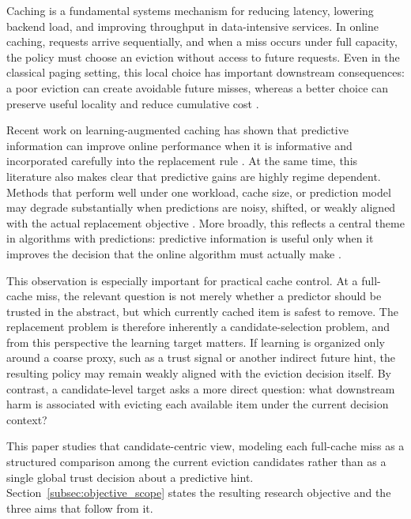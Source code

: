 \documentclass[preprint,12pt]{elsarticle}
\begin{document}
Caching is a fundamental systems mechanism for reducing latency, lowering backend load, and improving throughput in data-intensive services. In online caching, requests arrive sequentially, and when a miss occurs under full capacity, the policy must choose an eviction without access to future requests. Even in the classical paging setting, this local choice has important downstream consequences: a poor eviction can create avoidable future misses, whereas a better choice can preserve useful locality and reduce cumulative cost \cite{belady1966replacement_algorithms,fiat1991competitive_paging}.

Recent work on learning-augmented caching has shown that predictive information can improve online performance when it is informative and incorporated carefully into the replacement rule \cite{lykouris2021competitive_caching,antoniadis2020online_metric_untrusted,im2022parsimonious_lac}. At the same time, this literature also makes clear that predictive gains are highly regime dependent. Methods that perform well under one workload, cache size, or prediction model may degrade substantially when predictions are noisy, shifted, or weakly aligned with the actual replacement objective \cite{wei2020better_simpler_lac,chledowski2021robust_lac_experimental}. More broadly, this reflects a central theme in algorithms with predictions: predictive information is useful only when it improves the decision that the online algorithm must actually make \cite{mitzenmacher2022algorithms_predictions}.

This observation is especially important for practical cache control. At a full-cache miss, the relevant question is not merely whether a predictor should be trusted in the abstract, but which currently cached item is safest to remove. The replacement problem is therefore inherently a candidate-selection problem, and from this perspective the learning target matters. If learning is organized only around a coarse proxy, such as a trust signal or another indirect future hint, the resulting policy may remain weakly aligned with the eviction decision itself. By contrast, a candidate-level target asks a more direct question: what downstream harm is associated with evicting each available item under the current decision context?

This paper studies that candidate-centric view, modeling each full-cache miss as a structured comparison among the current eviction candidates rather than as a single global trust decision about a predictive hint. Section~\ref{subsec:objective_scope} states the resulting research objective and the three aims that follow from it.
\end{document}
